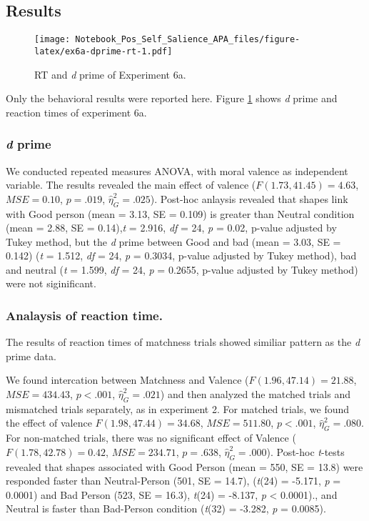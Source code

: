 \documentclass[man]{apa6}
\begin{document}
\hypertarget{results-9}{%
\subsection{Results}\label{results-9}}

\begin{figure}
\centering
\texttt{[image: Notebook\_Pos\_Self\_Salience\_APA\_files/figure-latex/ex6a-dprime-rt-1.pdf]}
\caption{\label{fig:ex6a-dprime-rt}RT and \emph{d} prime of Experiment 6a.}
\end{figure}

Only the behavioral results were reported here. Figure \ref{fig:ex6a-dprime-rt} shows \emph{d} prime and reaction times of experiment 6a.

\hypertarget{d-prime-6}{%
\subsubsection{\texorpdfstring{\emph{d} prime}{d prime}}\label{d-prime-6}}

We conducted repeated measures ANOVA, with moral valence as independent variable. The results revealed the main effect of valence (\(F(1.73, 41.45) = 4.63\), \(\mathit{MSE} = 0.10\), \(p = .019\), \(\hat{\eta}^2_G = .025\)). Post-hoc anlaysis revealed that shapes link with Good person (mean = 3.13, SE = 0.109) is greater than Neutral condition (mean = 2.88, SE = 0.14),\emph{t} = 2.916, \emph{df} = 24, \emph{p} = 0.02, p-value adjusted by Tukey method, but the \emph{d} prime between Good and bad (mean = 3.03, SE = 0.142) (\emph{t} = 1.512, \emph{df} = 24, \emph{p} = 0.3034, p-value adjusted by Tukey method), bad and neutral (\emph{t} = 1.599, \emph{df} = 24, \emph{p} = 0.2655, p-value adjusted by Tukey method) were not siginificant.

\hypertarget{analaysis-of-reaction-time.}{%
\subsubsection{Analaysis of reaction time.}\label{analaysis-of-reaction-time.}}

The results of reaction times of matchness trials showed similiar pattern as the \emph{d} prime data.

We found intercation between Matchness and Valence (\(F(1.96, 47.14) = 21.88\), \(\mathit{MSE} = 434.43\), \(p < .001\), \(\hat{\eta}^2_G = .021\)) and then analyzed the matched trials and mismatched trials separately, as in experiment 2. For matched trials, we found the effect of valence \(F(1.98, 47.44) = 34.68\), \(\mathit{MSE} = 511.80\), \(p < .001\), \(\hat{\eta}^2_G = .080\). For non-matched trials, there was no significant effect of Valence (\(F(1.78, 42.78) = 0.42\), \(\mathit{MSE} = 234.71\), \(p = .638\), \(\hat{\eta}^2_G = .000\)). Post-hoc \emph{t}-tests revealed that shapes associated with Good Person (mean = 550, SE = 13.8) were responded faster than Neutral-Person (501, SE = 14.7), (\emph{t}(24) = -5.171, \emph{p} = 0.0001) and Bad Person (523, SE = 16.3), \emph{t}(24) = -8.137, \emph{p} \textless{} 0.0001)., and Neutral is faster than Bad-Person condition (\emph{t}(32) = -3.282, \emph{p} = 0.0085).
\end{document}

